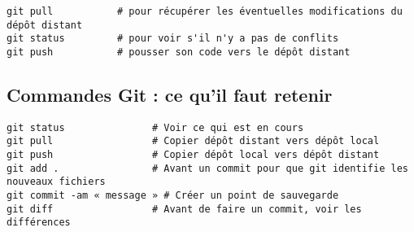\documentclass[11pt]{article}
\begin{document}
\noindent
\verb"git pull           # pour récupérer les éventuelles modifications du dépôt distant" \\
\verb"git status         # pour voir s'il n'y a pas de conflits" \\
\verb"git push           # pousser son code vers le dépôt distant" \\



\subsection*{Commandes Git : ce qu'il faut retenir}

\noindent
\verb"git status               # Voir ce qui est en cours" \\
\verb"git pull                 # Copier dépôt distant vers dépôt local" \\
\verb"git push                 # Copier dépôt local vers dépôt distant" \\
\verb"git add .                # Avant un commit pour que git identifie les nouveaux fichiers" \\
\verb"git commit -am « message » # Créer un point de sauvegarde" \\
\verb"git diff                 # Avant de faire un commit, voir les différences" \\








\end{document}
